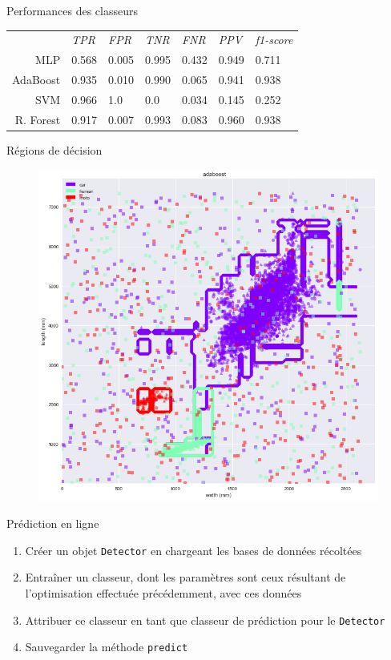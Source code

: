 \documentclass[usenames,dvipsnames]{beamer}
\begin{document}
\begin{frame}{Performances des classeurs}
\begin{table}
\centering
\begin{tabular}{r | llllll}
& \emph{TPR} & \emph{FPR} & \emph{TNR} & \emph{FNR} & \emph{PPV} & \emph{f1-score} \\ 
MLP & 0.568 & 0.005 & 0.995 & 0.432 & 0.949 & 0.711 \\
AdaBoost & 0.935 & 0.010 & 0.990 & 0.065 & 0.941 & 0.938 \\
SVM & 0.966 & 1.0 & 0.0 & 0.034 & 0.145 & 0.252 \\
R. Forest & 0.917 & 0.007 & 0.993 & 0.083 & 0.960 & 0.938 \\
\end{tabular}
\end{table}
\end{frame}

\begin{frame}{Régions de décision}
\begin{figure}
\centering
\includegraphics[width=.65\textwidth]{img/adaboost_contour.png}
\end{figure}
\end{frame}

\begin{frame}{Prédiction en ligne}
\begin{enumerate}
\item Créer un objet \texttt{Detector} en chargeant les bases de données récoltées
\item Entraîner un classeur, dont les paramètres sont ceux résultant de l'optimisation effectuée précédemment, avec ces données
\item Attribuer ce classeur en tant que classeur de prédiction pour le \texttt{Detector}
\item Sauvegarder la méthode \texttt{predict}
\end{enumerate}
\end{frame}
\end{document}
